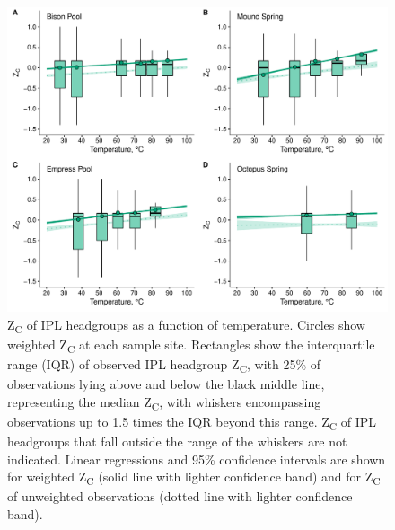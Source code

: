 \singlespace
\begin{figure}[h]
\centering
\includegraphics[width=1\linewidth]{"figs_ch1/boxplot - headgroup ZC"}
\caption[Z\textsubscript{C} of IPL headgroups as a function of temperature]{Z\textsubscript{C} of IPL headgroups as a function of temperature. Circles show weighted Z\textsubscript{C} at each sample site. Rectangles show the interquartile range (IQR) of observed IPL headgroup Z\textsubscript{C}, with 25\% of observations lying above and below the black middle line, representing the median Z\textsubscript{C}, with whiskers encompassing observations up to 1.5 times the IQR beyond this range. Z\textsubscript{C} of IPL headgroups that fall outside the range of the whiskers are not indicated. Linear regressions and 95\% confidence intervals are shown for weighted Z\textsubscript{C} (solid line with lighter confidence band) and for Z\textsubscript{C} of unweighted observations (dotted line with lighter confidence band).}
\label{fig:ZC_head}
\end{figure}
\doublespace




